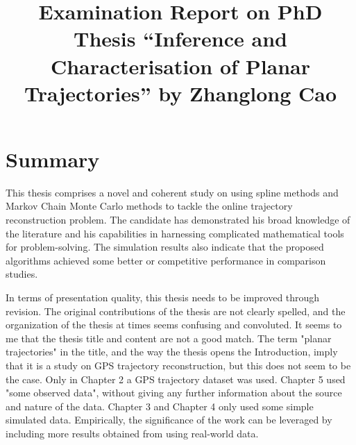 \documentclass[a4paper,18pt]{extarticle}
\title{Examination Report on PhD Thesis ``Inference and Characterisation of Planar Trajectories'' by Zhanglong Cao}
\date{}							%
\begin{document}
\maketitle


\section{Summary}
This thesis comprises a novel and coherent study on using spline methods and Markov Chain Monte Carlo methods to tackle the online trajectory reconstruction problem. The candidate has demonstrated his broad knowledge of the literature and his capabilities in harnessing complicated mathematical tools for problem-solving. The simulation results also indicate that the proposed algorithms achieved some better or competitive performance in comparison studies. 

In terms of presentation quality, this thesis needs to be improved through revision. The original contributions of the thesis are not clearly spelled, and the organization of the thesis at times seems confusing and convoluted. It seems to me that the thesis title and content are not a good match. The term "planar trajectories" in the title, and the way the thesis opens the Introduction, imply that it is a study on GPS trajectory reconstruction, but this does not seem to be the case. Only in Chapter 2 a GPS trajectory dataset was used. Chapter 5 used "some observed data", without giving any further information about the source and nature of the data. Chapter 3 and Chapter 4 only used some simple simulated data. Empirically, the significance of the work can be leveraged by including more results obtained from using real-world data. 
\end{document}
